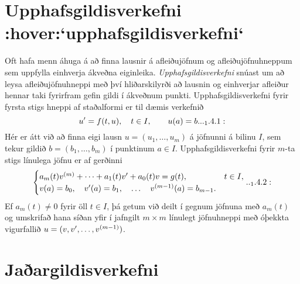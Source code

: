 \section{Upphafsgildisverkefni :hover:`upphafsgildisverkefni`}

\noindent
Oft hafa menn áhuga á að finna lausnir á afleiðujöfnum og
afleiðujöfnuhneppum sem uppfylla einhverja ákveðna eiginleika.  {\it
Upphafsgildisverkefni}  snúast um að leysa afleiðujöfnuhneppi með því
hliðarskilyrði að lausnin og einhverjar afleiður hennar taki fyrirfram
gefin gildi í ákveðnum punkti.   Upphafsgildisverkefni fyrir fyrsta
stigs hneppi af staðalformi er til dæmis verkefnið
\begin{equation*}
u\dash=f(t,u), \quad t\in I, \qquad u(a)=b.


.. _1.4.1:

\end{equation*}
Hér er átt við að finna eigi lausn $u=(u_1,\dots,u_m)$ á jöfnunni á
bilinu $I$, sem tekur gildið $b=(b_1,\dots,b_m)$ í punktinum $a\in I$.
Upphafsgildisverkefni fyrir $m$-ta stigs línulega jöfnu er af gerðinni
\begin{equation*}
\begin{cases} a_m(t)v^{(m)}+\cdots+a_1(t)v\dash+a_0(t)v=g(t), & t\in I,\\
v(a)=b_0, \quad v\dash(a)=b_1, \quad \dots \quad  v^{(m-1)}(a)=b_{m-1}.&
\end{cases}


.. _1.4.2:

\end{equation*}
Ef $a_m(t)\neq 0$ fyrir öll $t\in I$, þá getum við deilt í gegnum
jöfnuna með $a_m(t)$ og umskrifað hana síðan yfir í jafngilt $m\times m$
línulegt jöfnuhneppi með óþekkta vigurfallið
$u=(v,v{\sp{\prime}},\dots,v^{(m-1)})$. 


\section{Jaðargildisverkefni}


